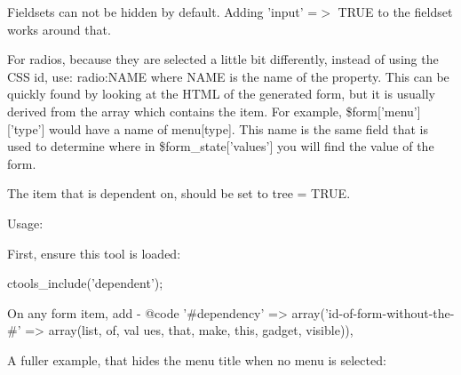 Fieldsets can not be hidden by default. Adding 'input' =$>$ TRUE to the fieldset works around that.

For radios, because they are selected a little bit differently, instead of using the CSS id, use: radio:NAME where NAME is the name of the property. This can be quickly found by looking at the HTML of the generated form, but it is usually derived from the array which contains the item. For example, \$form\mbox{[}'menu'\mbox{]}\mbox{[}'type'\mbox{]} would have a name of menu\mbox{[}type\mbox{]}. This name is the same field that is used to determine where in \$form\_\-state\mbox{[}'values'\mbox{]} you will find the value of the form.

The item that is dependent on, should be set to tree = TRUE.

Usage:

First, ensure this tool is loaded: 
\begin{DoxyCode}
 { ctools_include('dependent'); }

 On any form item, add
 - @code '#dependency' => array('id-of-form-without-the-#' => array(list, of, val
      ues, that, make, this, gadget, visible)), 
\end{DoxyCode}


A fuller example, that hides the menu title when no menu is selected: 


